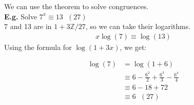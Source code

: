 \documentclass[11pt]{article}
\begin{document}
We can use the theorem to solve congruences.\\[1em]

\textbf{E.g.} Solve $7^x \equiv 13 \hspace{7pt} (27)$\\[0.5em]

7 and 13 are in $1+ 3\mathbb{Z}/27$, so we can take their logarithms.
\begin{align*}
	x \log(7) \equiv \log(13)
\end{align*}
Using the formula for $\log(1+3x)$, we get:

\begin{align*}
	\log(7) &= \log(1+6)\\[0.5em]
	&\equiv 6 - \frac{6^2}{2} + \frac{6^3}{3} -\frac{6^4}{4}\\[0.5em]
	&\equiv 6-18+72\\[0.5em]
	&\equiv 6 \hspace{7pt} (27)
\end{align*}
\end{document}
